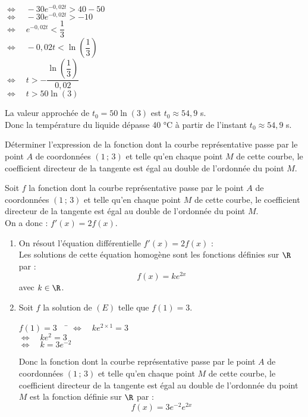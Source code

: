 \documentclass[a4paper,11pt,exos]{nsi}
\begin{document}
{\begin{enumerate}
\begin{tabbing}
            \> $\iff\quad -30e^{-0{,}02t} > 40 - 50$\\
            \> $\iff\quad -30e^{-0{,}02t} > -10$\\
            \> $\iff\quad e^{-0{,}02t} < \dfrac{1}{3}$\\
            \> $\iff\quad -0{,}02t < \ln\left(\dfrac{1}{3}\right)$\\
            \> $\iff\quad t > -\dfrac{\ln\left(\dfrac{1}{3}\right)}{0{,}02}$\\
            \> $\iff\quad t > 50\ln(3)$    
        \end{tabbing}
        La valeur approchée de $t_0=50\ln(3)$ est $t_0 \approx 54{,}9$ s.\\
        Donc la température du liquide dépasse 40 °C à partir de l'instant $t_0 \approx 54{,}9$ s.
    \end{enumerate}
}

\exo{}
Déterminer l'expression de la fonction dont la courbe représentative passe par le point $A$ de coordonnées $(1\,;\,3)$ et telle qu'en chaque point $M$ de cette courbe, le coefficient directeur de la tangente est égal au double de l'ordonnée du point $M$.\\

\textcolor{UGLiBlue}{
    Soit $f$ la fonction dont la courbe représentative passe par le point $A$ de coordonnées $(1\,;\,3)$ et telle qu'en chaque point $M$ de cette courbe, le coefficient directeur de la tangente est égal au double de l'ordonnée du point $M$.\\
    On a donc : $f'(x) = 2f(x)$.
    \begin{enumerate}[label=\textbullet]
        \item On résout l'équation différentielle $f'(x) = 2f(x)$ :\\
        Les solutions de cette équation homogène sont les fonctions définies sur $\R$ par :
        $$f(x) = ke^{2x}$$
        avec $k \in \R$.
        \item Soit $f$ la solution de $(E)$ telle que $f(1)=3$.
        \begin{tabbing}
            $f(1)=3 \quad$ \= $\iff\quad ke^{2\times 1} = 3$\\
            \> $\iff\quad ke^{2} = 3$\\
            \> $\iff\quad k = 3e^{-2}$
        \end{tabbing}
        Donc la fonction dont la courbe représentative passe par le point $A$ de coordonnées $(1\,;\,3)$ et telle qu'en chaque point $M$ de cette courbe, le coefficient directeur de la tangente est égal au double de l'ordonnée du point $M$ est la fonction définie sur $\R$ par :
        $$f(x) = 3e^{-2}e^{2x}$$
    \end{enumerate}
}
\end{document}
